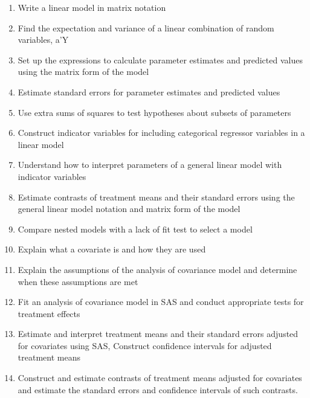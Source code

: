 \documentclass[]{book}
\begin{document}
\begin{enumerate}
\item
  Write a linear model in matrix notation
\item
  Find the expectation and variance of a linear combination of random variables, a'Y
\item
  Set up the expressions to calculate parameter estimates and predicted values using the matrix form of the model
\item
  Estimate standard errors for parameter estimates and predicted values
\item
  Use extra sums of squares to test hypotheses about subsets of parameters
\item
  Construct indicator variables for including categorical regressor variables in a linear model
\item
  Understand how to interpret parameters of a general linear model with indicator variables
\item
  Estimate contrasts of treatment means and their standard errors using the general linear model notation and matrix form of the model
\item
  Compare nested models with a lack of fit test to select a model
\item
  Explain what a covariate is and how they are used
\item
  Explain the assumptions of the analysis of covariance model and determine when these assumptions are met
\item
  Fit an analysis of covariance model in SAS and conduct appropriate tests for treatment effects
\item
  Estimate and interpret treatment means and their standard errors adjusted for covariates using SAS, Construct confidence intervals for adjusted treatment means
\item
  Construct and estimate contrasts of treatment means adjusted for covariates and estimate the standard errors and confidence intervals of such contrasts.
\end{enumerate}
\end{document}
